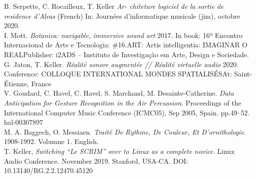 \documentclass[journal,onecolumn]{IEEEtran}
\begin{document}
\begin{thebibliography}{1}
B. Serpette, C. Rocailleux, T. Keller \emph{Ar-
chiteture logiciel de la sortie de residence d’Aleas} (French)
In: Journées d’informatique musicale (jim), octobre 2020. \\

I. Mott. \emph{Botanica: navigable, immersive sound art} 
2017. In book: 16º Encontro Internacional de Arte e Tecnologia: \#16.ART: Artis intelligentia: IMAGINAR O REALPublisher: i2ADS – Instituto de Investigação em Arte, Design e Sociedade. \\

G. Jaton, T. Keller. \emph{Réalité sonore augmentée // Réalité virtuelle audio} 2020. Conference: COLLOQUE INTERNATIONAL MONDES SPATIALISÉSAt: Saint-Étienne, France \\

V. Goudard, C. Havel, C. Havel, S. Marchand, M. Desainte-Catherine. \emph{Data Anticipation for Gesture Recognition in the Air Percussion}. Proceedings of the International Computer Music Conference (ICMC05), Sep 2005, Spain. pp.49–52. hal-00307897 \\

M. A. Baggech, O. Messiaen. \emph{Traité De Rythme, De Couleur, Et D'ornithologie}. 1908-1992. Volumne 1. English. \\

T. Keller,  \emph{Switching ``Le SCRIM'' over to Linux as a complete novice}. Linux Audio Conference. November 2019. Stanford, USA-CA. DOI: 10.13140/RG.2.2.12470.45120 \\

\end{thebibliography}

% 

\end{document}
